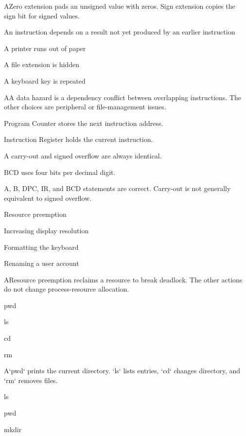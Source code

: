 \begin{enumerate}[label=\textbf{Q\arabic*.}, leftmargin=*]
  {A}{Zero extension pads an unsigned value with zeros. Sign extension copies the sign bit for signed values.}
  {\item An instruction depends on a result not yet produced by an earlier instruction
   \item A printer runs out of paper
   \item A file extension is hidden
   \item A keyboard key is repeated}
  {A}{A data hazard is a dependency conflict between overlapping instructions. The other choices are peripheral or file-management issues.}
  {\item Program Counter stores the next instruction address.
   \item Instruction Register holds the current instruction.
   \item A carry-out and signed overflow are always identical.
   \item BCD uses four bits per decimal digit.}
  {A, B, D}{PC, IR, and BCD statements are correct. Carry-out is not generally equivalent to signed overflow.}
\fi
\ifnum{}
  {\item Resource preemption
   \item Increasing display resolution
   \item Formatting the keyboard
   \item Renaming a user account}
  {A}{Resource preemption reclaims a resource to break deadlock. The other actions do not change process-resource allocation.}
  {\item pwd
   \item ls
   \item cd
   \item rm}
  {A}{`pwd` prints the current directory. `ls` lists entries, `cd` changes directory, and `rm` removes files.}
  {\item ls
   \item pwd
   \item mkdir
}
\end{enumerate}
